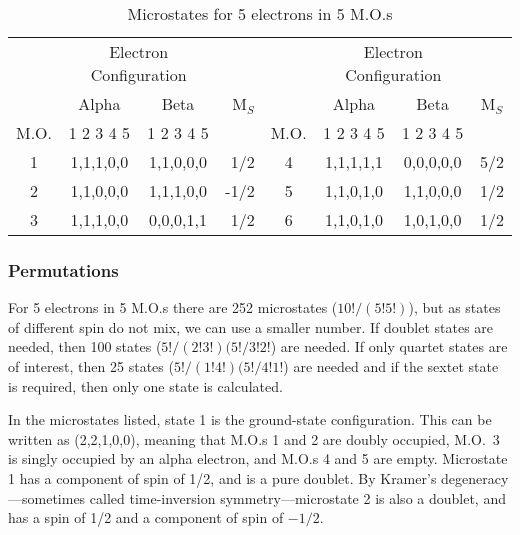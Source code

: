\begin{table}
\begin{center}
\caption{\label{m55}  Microstates for 5 electrons in 5 M.O.s}
\begin{tabular}{cccrcccc}\\ \hline
& \multicolumn{2}{c}{Electron Configuration}& & &  \multicolumn{2}{c}{Electron Configuration}& \\
\cline{2-3} \cline{6-7}
  &     Alpha   &   Beta    & M$_S$  &    &   Alpha    &  Beta  & M$_S$    \\
M.O.  &   1 2 3 4 5 &1 2 3 4 5  &       & M.O. &  1 2 3 4 5 &1 2 3 4 5\\ \hline

1 &   1,1,1,0,0 &1,1,0,0,0  & 1/2   &  4 &  1,1,1,1,1 &0,0,0,0,0 &   5/2\\
2 &   1,1,0,0,0 &1,1,1,0,0  &-1/2   &  5 &  1,1,0,1,0 &1,1,0,0,0 &   1/2\\
3 &   1,1,1,0,0 &0,0,0,1,1  & 1/2   &  6 &  1,1,0,1,0 &1,0,1,0,0 &   1/2 \\ \hline
\end{tabular}
\end{center}
\end{table}

\subsubsection{Permutations}
For  5  electrons  in  5   M.O.s   there   are   252   microstates
($10!/(5!5!)$),  but as states of different spin do not mix, we can use a
smaller  number.   If  doublet  states  are  needed, then   100   states
($5!/(2!3!)(5!/3!2!$)  are  needed.   If  only  quartet  states  are of
 interest, then 25 states ($5!/(1!4!)(5!/4!1!$) are
needed  and  if  the  sextet state is required, then only
one state is calculated.

In  the  microstates  listed,   state   1   is   the   ground-state
configuration.   This can be written as (2,2,1,0,0), meaning that M.O.s 1 and 2
are doubly occupied, M.O.\  3 is  singly  occupied  by  an  alpha electron, and
M.O.s 4 and 5 are empty.  Microstate 1 has a component of  spin of 1/2, and is a pure doublet.  By Kramer's
degeneracy---sometimes called time-inversion symmetry---microstate 2 is also a
doublet, and has a spin of 1/2 and a component of spin of $-1/2$.

